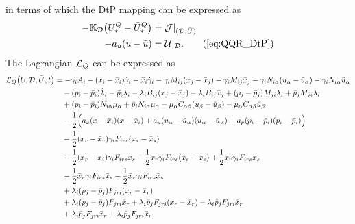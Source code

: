 \documentclass[11pt]{article}
\begin{document}
in terms of which the DtP mapping can be expressed as
\begin{subequations}\label{eq:QQR_DtP}
    \allowdisplaybreaks
    \begin{align}
        - \K_\dee \big(U^Q_* - \bar{U}^Q_*\big) & = \mathcal{J}|_{(\dee,\bar{U})} \notag\\
        - a_u (u - \bar{u}) & = \calU |_\dee. \tag{\ref{eq:QQR_DtP}}
    \end{align}
\end{subequations}
The Lagrangian $\mathcal{L}_Q$ can be expressed as
\begin{subequations}\label{eq:mixed_QQR_L}
\allowdisplaybreaks
\begin{align}
    \scl_Q \big( U,\dee,\bar{U},t\big) & = - \gamma_i A_i -(x_i - \bar{x}_i) \dot{\gamma}_i - \bar{x}_i \dot{\gamma}_i - \gamma_i M_{ij} (x_j - \bar{x}_j) - \gamma_i M_{ij} \bar{x}_j - \gamma_i N_{i\alpha} (u_\alpha - \bar{u}_\alpha) - \gamma_i N_{i \alpha} \bar{u}_\alpha \notag\\
    & \quad - (p_i - \bar{p}_i) \dot{\lambda}_i - \bar{p}_i \dot{\lambda}_i - \lambda_i B_{ij} (x_j - \bar{x}_j) - \lambda_i B_{ij} \bar{x}_j + (p_j - \bar{p}_j) M_{ji} \lambda_i + \bar{p}_j M_{ji} \lambda_i \notag\\
    & \quad + (p_i - \bar{p}_i) N_{i \alpha} \mu_\alpha + \bar{p}_i N_{i \alpha} \mu_\alpha - \mu_\alpha C_{\alpha \beta} (u_\beta - \bar{u}_\beta) - \mu_\alpha 
    C_{\alpha \beta} \bar{u}_\beta \notag\\
    & \quad - \half \Big( a_x (x - \bar{x}_i) (x - \bar{x}_i) + a_u(u_\alpha - \bar{u}_\alpha) (u_\alpha - \bar{u}_\alpha) + a_p(p_i - \bar{p}_i)(p_i - \bar{p}_i) \Big) \notag\\
    & \quad - \half (x_r - \bar{x}_r) \gamma_i F_{irs} (x_s - \bar{x}_s) \notag\\
    & \quad - \half (x_r - \bar{x}_i) \gamma_iF_{irs} \bar{x}_s  - \half \bar{x}_r \gamma_i F_{irs} (x_s - \bar{x}_s) + \half \bar{x}_r \gamma_i F_{irs} \bar{x}_s \notag\\
    & \quad - \half \bar{x}_r \gamma_i F_{irs} \bar{x}_s - \half \bar{x}_r \gamma_i F_{irs} \bar{x}_s \notag\\
    & \quad + \lambda_i ( p_j - \bar{p}_j ) F_{jri} ( x_r - \bar{x}_r ) \notag \\
    & \quad + \lambda_i (p_j - \bar{p}_j ) F_{jri} \bar{x}_r + \lambda_i \bar{p}_j F_{jri} ( x_r - \bar{x}_r ) - \lambda_i \bar{p}_j F_{jri} \bar{x}_r \notag \\
    & \quad + \lambda_i \bar{p}_j F_{jri} \bar{x}_r + \lambda_i \bar{p}_j F_{jri} \bar{x}_r \notag \\

\end{align}
\end{subequations}
\end{document}
